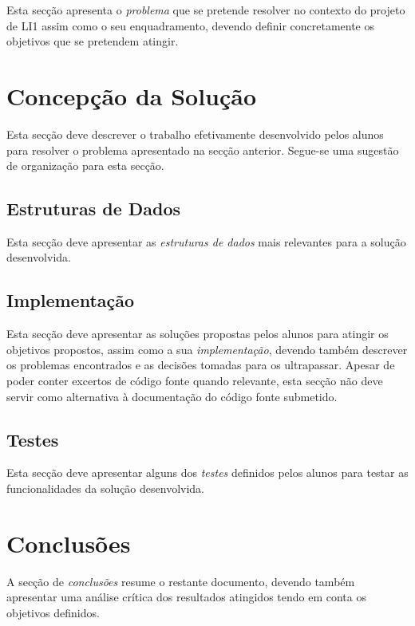 \documentclass[a4paper]{article}
\begin{document}
Esta secção apresenta o \emph{problema} que se pretende resolver no
contexto do projeto de LI1 assim como o seu enquadramento, devendo
definir concretamente os objetivos que se pretendem atingir.

\section{Concepção da Solução}
\label{sec:solucao}

Esta secção deve descrever o trabalho efetivamente desenvolvido pelos
alunos para resolver o problema apresentado na secção
anterior. Segue-se uma sugestão de organização para esta secção.

\subsection{Estruturas de Dados}

Esta secção deve apresentar as \emph{estruturas de dados} mais
relevantes para a solução desenvolvida.

\subsection{Implementação}

Esta secção deve apresentar as soluções propostas pelos alunos para
atingir os objetivos propostos, assim como a sua \emph{implementação},
devendo também descrever os problemas encontrados e as decisões
tomadas para os ultrapassar. Apesar de poder conter excertos de código
fonte quando relevante, esta secção não deve servir como alternativa à
documentação do código fonte submetido.

\subsection{Testes}

Esta secção deve apresentar alguns dos \emph{testes} definidos pelos
alunos para testar as funcionalidades da solução desenvolvida.

\section{Conclusões}
\label{sec:conclusao}

A secção de \emph{conclusões} resume o restante documento, devendo
também apresentar uma análise crítica dos resultados atingidos tendo
em conta os objetivos definidos.
\end{document}
